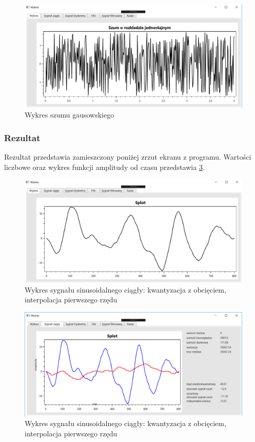 \documentclass[12pt]{article}
\begin{document}
\begin{figure}[h!]
 \centering
 \includegraphics[width=12.3cm]{szum.PNG}
 \vspace{-0.3cm}
 \caption{Wykres szumu gausowskiego}
 \label{szum}
\end{figure}
 \newpage
\subsubsection{Rezultat}

Rezultat przedstawia zamieszczony poniżej zrzut ekranu z programu. Wartości liczbowe oraz wykres funkcji amplitudy od czasu przedstawia \ref{Wykres dla wynikw eksperymentu pierwszego}.
\begin{figure}[h!]
 \centering
 \includegraphics[width=12.3cm]{splot.PNG}
 \vspace{-0.3cm}
 \caption{Wykres sygnału sinusoidalnego ciągły: kwantyzacja z obcięciem, interpolacja pierwszego rzędu}
 \label{Wykres dla wynikw eksperymentu pierwszego}
\end{figure}
 \newpage
\begin{figure}[h!]
 \centering
 \includegraphics[width=12.3cm]{splotC.PNG}
 \vspace{-0.3cm}
 \caption{Wykres sygnału sinusoidalnego ciągły: kwantyzacja z obcięciem, interpolacja pierwszego rzędu}
 \label{Wykres dla wynikw eksperymentu pierwszego}
\end{figure}
\end{document}
